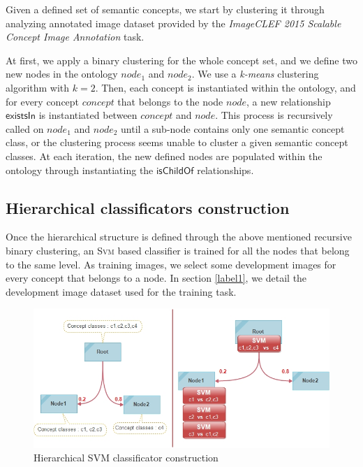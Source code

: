 Given a defined set of semantic concepts, we start by clustering it through analyzing annotated image dataset provided by the \textit{ImageCLEF 2015 Scalable Concept Image Annotation} task.  

At first, we apply a binary clustering for the whole concept set, and we define two new nodes in the ontology $node_{1}$ and $node_{2}$.
We use a \textit{k-means} clustering algorithm with $k=2$.
 Then, each concept is instantiated within the ontology, and for every concept $concept$ that belongs to the node $node$, a new relationship $\mathsf{existsIn}$ is instantiated between $concept$ and $node$. This process is recursively called on $node_{1}$ and $node_{2}$ until a sub-node contains only one semantic concept class, or the clustering process seems unable to cluster a given semantic concept classes. At each iteration, the new defined nodes are populated within the ontology through instantiating the $\mathsf{isChildOf}$ relationships. 

		\subsection{Hierarchical classificators construction}

Once the hierarchical structure is defined through the above mentioned recursive binary clustering, an \textsc{Svm} based classifier is trained for all the nodes that belong to the same level. As training images, we select some development images for every concept that belongs to a node. In section \ref{label1}, we detail the development image dataset used for the training task.

\begin{figure}[ht!]
	\centering
	\includegraphics[scale=0.8]{graphics/contrib3:figure3}
	\caption{Hierarchical SVM classificator construction}
	\label{fig4}
\end{figure}

